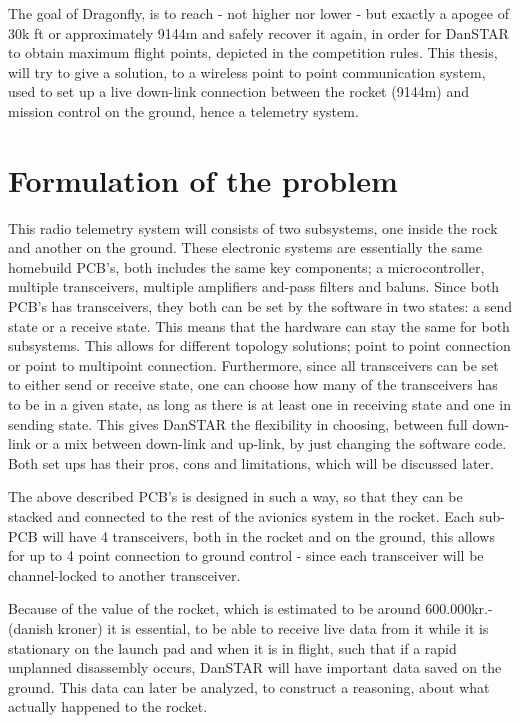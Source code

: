 
The goal of Dragonfly, is to reach - not higher nor lower - but exactly a apogee of 30k ft or approximately 9144m and safely recover it again, in order for DanSTAR to obtain maximum flight points, depicted in the competition rules. This thesis, will try to give a solution, to a wireless point to point communication system, used to set up a live down-link connection between the rocket (9144m) and mission control on the ground, hence a telemetry system. 

\newpage

\section{Formulation of the problem}
This radio telemetry system will consists of two subsystems, one inside the rock and another on the ground. These electronic systems are essentially the same homebuild PCB's, both includes the same key components; a microcontroller, multiple transceivers, multiple amplifiers and-pass filters and baluns. Since both PCB's has transceivers, they both can be set by the software in two states: a send state or a receive state. This means that the hardware can stay the same for both subsystems. This allows for different topology solutions; point to point connection or point to multipoint connection. Furthermore, since all transceivers can be set to either send or receive state, one can choose how many of the transceivers has to be in a given state, as long as there is at least one in receiving state and one in sending state. This gives DanSTAR the flexibility in choosing, between full down-link or a mix between down-link and up-link, by just changing the software code. Both set ups has their pros, cons and limitations, which will be discussed later. 


The above described PCB's is designed in such a way, so that they can be stacked and connected to the rest of the avionics system in the rocket. Each sub-PCB will have 4 transceivers, both in the rocket and on the ground, this allows for up to 4 point connection to ground control - since each transceiver will be channel-locked to another transceiver.

Because of the value of the rocket, which is estimated to be around 600.000kr.- (danish kroner) it is essential, to be able to receive live data from it while it is stationary on the launch pad and when it is in flight, such that if a rapid unplanned disassembly\cite{WikipediaRUD} occurs, DanSTAR will have important data saved on the ground. This data can later be analyzed, to construct a reasoning, about what actually happened to the rocket.

